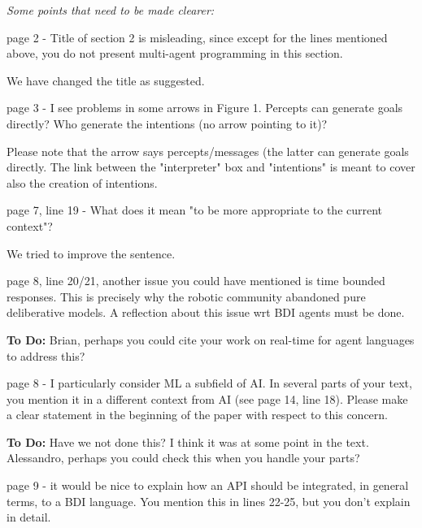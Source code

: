 \documentclass[12pt]{article}
\newenvironment{reviews}{\bigskip\itshape}{\upshape\bigskip}
\newenvironment{response}{\bigskip\normalfont}{\bigskip}
\newcommand{\tbd}[1]{\textsf{\textbf{To Do:} #1}}
\begin{document}
\begin{reviews}
Some points that need to be made clearer:

page 2 - Title of section 2 is misleading, since except for the lines
mentioned above, you do not present multi-agent programming in this
section.

\begin{response}
We have changed the title as suggested.
\end{response}

page 3 - I see problems in some arrows in  Figure 1. Percepts can
generate goals directly? Who generate the intentions (no arrow
pointing to it)?

\begin{response}
Please note that the arrow says percepts/messages (the latter can generate goals directly. The link between the "interpreter" box and "intentions" is meant to cover also the creation of intentions.
\end{response}

page 7, line 19 - What does it mean "to be more appropriate to the
current context"?

\begin{response}
We tried to improve the sentence.
\end{response}

page 8, line 20/21, another issue you could have mentioned is time bounded
responses. This is precisely why the robotic community abandoned 
pure deliberative models. A reflection about this issue wrt BDI agents
must be done.

\begin{response}
\tbd{Brian, perhaps you could cite your work on real-time for agent languages to address this?}
\end{response}

page 8 - I particularly consider ML a subfield of AI. In several parts
of your text, you mention it in a different context from AI (see page
14, line 18). Please make a clear statement in the beginning of the
paper with respect to this concern.

\begin{response}
\tbd{Have we not done this? I think it was at some point in the text. Alessandro, perhaps you could check this when you handle your parts?}
\end{response}

page 9 - it would be nice to explain how an API should be integrated, in
general terms, to a BDI language. You mention this in lines 22-25, but
you don't explain in detail.


\end{reviews}
\end{document}
